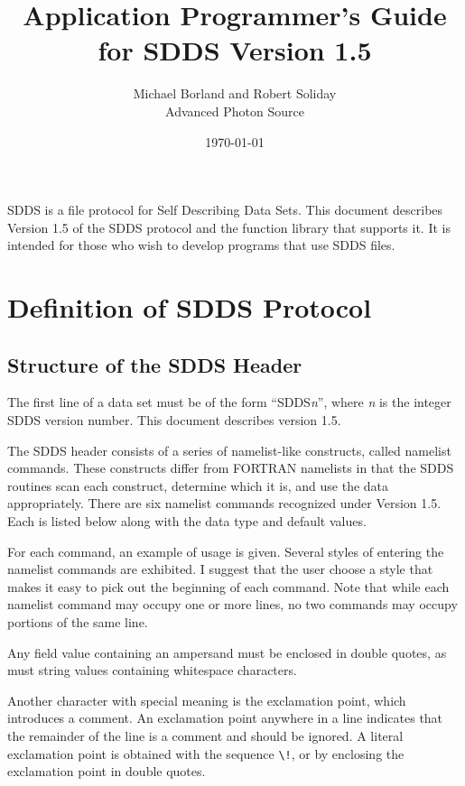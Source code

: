 \documentclass[11pt]{article}
\begin{document}
\title{Application Programmer's Guide for SDDS Version 1.5}
\author{Michael Borland and Robert Soliday\\Advanced Photon Source\\ \date{\today}}
\maketitle

SDDS is a file protocol for Self Describing Data Sets. This document describes Version 1.5 of the SDDS protocol and the function library that supports it. It is intended for those who wish to develop programs that use SDDS files.

\section{Definition of SDDS Protocol}

\subsection{Structure of the SDDS Header}
\label{sect:header}

The first line of a data set must be of the form ``SDDS{\em n}'', where {\em n} is the integer SDDS version number. This document describes version 1.5.

The SDDS header consists of a series of namelist-like constructs, called namelist commands.  These constructs differ from FORTRAN namelists in that the SDDS routines scan each construct, determine which it is, and use the data appropriately. There are six namelist commands recognized under Version 1.5.  Each is listed below along with the data type and default values.

For each command, an example of usage is given.  Several styles of entering the namelist commands are exhibited.  I suggest that the user choose a style that makes it easy to pick out the beginning of each command.  Note that while each namelist command may occupy one or more lines, no two commands may occupy portions of the same line.

Any field value containing an ampersand must be enclosed in double quotes, as must string values containing whitespace characters.

Another character with special meaning is the exclamation point, which introduces a comment.  An exclamation point anywhere in a line indicates that the remainder of the line is a comment and should be ignored.  A literal exclamation point is obtained with the sequence \verb|\!|, or by enclosing the exclamation point in double quotes.
\end{document}
